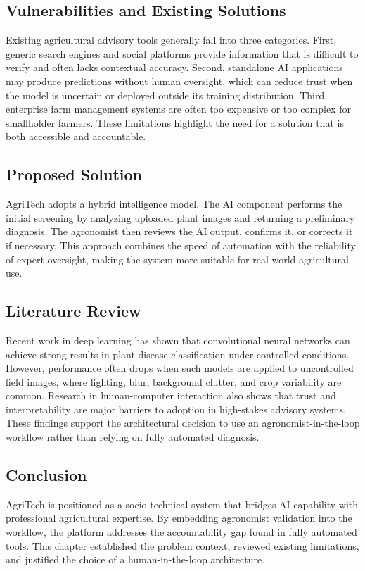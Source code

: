 \documentclass[12pt]{article}
\begin{document}
\subsection{Vulnerabilities and Existing Solutions}
Existing agricultural advisory tools generally fall into three categories. First, generic search engines and social platforms provide information that is difficult to verify and often lacks contextual accuracy. Second, standalone AI applications may produce predictions without human oversight, which can reduce trust when the model is uncertain or deployed outside its training distribution. Third, enterprise farm management systems are often too expensive or too complex for smallholder farmers. These limitations highlight the need for a solution that is both accessible and accountable.

\subsection{Proposed Solution}
AgriTech adopts a hybrid intelligence model. The AI component performs the initial screening by analyzing uploaded plant images and returning a preliminary diagnosis. The agronomist then reviews the AI output, confirms it, or corrects it if necessary. This approach combines the speed of automation with the reliability of expert oversight, making the system more suitable for real-world agricultural use.

\subsection{Literature Review}
Recent work in deep learning has shown that convolutional neural networks can achieve strong results in plant disease classification under controlled conditions. However, performance often drops when such models are applied to uncontrolled field images, where lighting, blur, background clutter, and crop variability are common. Research in human-computer interaction also shows that trust and interpretability are major barriers to adoption in high-stakes advisory systems. These findings support the architectural decision to use an agronomist-in-the-loop workflow rather than relying on fully automated diagnosis.

\subsection{Conclusion}
AgriTech is positioned as a socio-technical system that bridges AI capability with professional agricultural expertise. By embedding agronomist validation into the workflow, the platform addresses the accountability gap found in fully automated tools. This chapter established the problem context, reviewed existing limitations, and justified the choice of a human-in-the-loop architecture.
\end{document}
